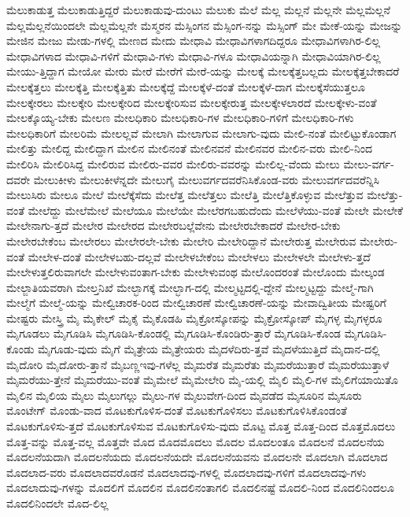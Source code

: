 {ಮೆಲುಕಾಡುತ್ತ
ಮೆಲುಕಾಡುತ್ತಿದ್ದರೆ
ಮೆಲುಕಾಡುವು-ದುಂಟು
ಮೆಲುಕು
ಮೆಲೆ
ಮೆಲ್ಲ
ಮೆಲ್ಲನೆ
ಮೆಲ್ಲನೇ
ಮೆಲ್ಲಮೆಲ್ಲನೆ
ಮೆಲ್ಲಮೆಲ್ಲನೆಯಿಂದಲೇ
ಮೆಲ್ಲಮೆಲ್ಲನೇ
ಮೆಸ್ಮರನ
ಮೆಸ್ಸಿಂಗನ
ಮೆಸ್ಸಿಂಗ-ನನ್ನು
ಮೆಸ್ಸಿಂಗ್
ಮೇ
ಮೇಕೆ-ಯನ್ನು
ಮೇಜನ್ನು
ಮೇಜಿನ
ಮೇಜು
ಮೇಡು-ಗಳಲ್ಲಿ
ಮೇಣದ
ಮೇದು
ಮೇಧಾವಿ
ಮೇಧಾವಿಗಳಾಗದಿದ್ದರೂ
ಮೇಧಾವಿಗಳಾಗಿರ-ಲಿಲ್ಲ
ಮೇಧಾವಿಗಳಾದ
ಮೇಧಾವಿ-ಗಳಿಗೆ
ಮೇಧಾವಿ-ಗಳು
ಮೇಧಾವಿ-ಗಳೂ
ಮೇಧಾವಿಯನ್ನಾಗಿ
ಮೇಧಾವಿಯಾಗಿರ-ಲಿಲ್ಲ
ಮೇಯು-ತ್ತಿದ್ದಾಗ
ಮೇಯೋ
ಮೇರು
ಮೇರೆ
ಮೇರೆಗೆ
ಮೇರೆ-ಯನ್ನು
ಮೇಲಕ್ಕೆ
ಮೇಲಕ್ಕೆತ್ತಬಲ್ಲದು
ಮೇಲಕ್ಕೆತ್ತಬೇಕಾದರೆ
ಮೇಲಕ್ಕೆತ್ತಲು
ಮೇಲಕ್ಕೆತ್ತಿ
ಮೇಲಕ್ಕೆತ್ತಿತು
ಮೇಲಕ್ಕೆದ್ದೆ
ಮೇಲಕ್ಕೆಳೆ-ದಂತೆ
ಮೇಲಕ್ಕೆಳೆ-ದಾಗ
ಮೇಲಕ್ಕೆಸೆಯುತ್ತಲೂ
ಮೇಲಕ್ಕೇರಲು
ಮೇಲಕ್ಕೇರಿ
ಮೇಲಕ್ಕೇರಿದ
ಮೇಲಕ್ಕೇರಿಸುವ
ಮೇಲಕ್ಕೇರುತ್ತ
ಮೇಲಕ್ಕೇಳಲಾರದೆ
ಮೇಲಕ್ಕೇಳು-ವಂತೆ
ಮೇಲಕ್ಕೊಯ್ಯ-ಬೇಕು
ಮೇಲಣ
ಮೇಲಧಿಕಾರಿ
ಮೇಲಧಿಕಾರಿ-ಗಳ
ಮೇಲಧಿಕಾರಿ-ಗಳಿಗೆ
ಮೇಲಧಿಕಾರಿ-ಗಳು
ಮೇಲಧಿಕಾರಿಗೆ
ಮೇಲರಿಮೆ
ಮೇಲಲ್ಲವೆ
ಮೇಲಾಗಿ
ಮೇಲಾಗುವ
ಮೇಲಾಗು-ವುದು
ಮೇಲಿ-ನಂತೆ
ಮೇಲಿಟ್ಟುಕೊಂಡಾಗ
ಮೇಲಿತ್ತು
ಮೇಲಿದ್ದ
ಮೇಲಿದ್ದಾಗ
ಮೇಲಿನ
ಮೇಲಿನಂತೆ
ಮೇಲಿನವನೆ
ಮೇಲಿನವರ
ಮೇಲಿನ-ವರು
ಮೇಲಿ-ನಿಂದ
ಮೇಲಿರಿಸಿ
ಮೇಲಿರಿಸಿದ್ದ
ಮೇಲಿರುವ
ಮೇಲಿರು-ವವರ
ಮೇಲಿರು-ವವರನ್ನು
ಮೇಲಿಲ್ಲ-ವೆಂದು
ಮೇಲು
ಮೇಲು-ವರ್ಗ-ದವರೇ
ಮೇಲುಕೀಳು
ಮೇಲುಕೀಳೆನ್ನದೇ
ಮೇಲುಗೈ
ಮೇಲುವರ್ಗದವರೆನಿಸಿಕೊಂಡ-ವರು
ಮೇಲುವರ್ಗದವರೆನ್ನಿಸಿ
ಮೇಲುಸಿರು
ಮೇಲೂ
ಮೇಲೆ
ಮೇಲೆಕ್ಕೆಸೆದು
ಮೇಲೆತ್ತ
ಮೇಲೆತ್ತಲು
ಮೇಲೆತ್ತಿ
ಮೇಲೆತ್ತಿಕೊಳ್ಳುವ
ಮೇಲೆತ್ತುವ
ಮೇಲೆತ್ತು-ವಂತೆ
ಮೇಲೆದ್ದು
ಮೇಲೆಮೇಲೆ
ಮೇಲೆಯೂ
ಮೇಲೆಯೇ
ಮೇಲೆರಗಬಹುದೆಂದು
ಮೇಲೆಳೆಯು-ವಂತೆ
ಮೇಲೇ
ಮೇಲೇಕೆ
ಮೇಲೇನಾಗು-ತ್ತದೆ
ಮೇಲೇರ
ಮೇಲೇರದ
ಮೇಲೇರಬಲ್ಲೆವೇನು
ಮೇಲೇರಬೇಕಾದರೆ
ಮೇಲೇರ-ಬೇಕು
ಮೇಲೇರಬೇಕೆಂಬ
ಮೇಲೇರಲು
ಮೇಲೇರಲೇ-ಬೇಕು
ಮೇಲೇರಿ
ಮೇಲೇರಿದ್ದಾನೆ
ಮೇಲೇರುತ್ತ
ಮೇಲೇರುವ
ಮೇಲೇರು-ವಂತೆ
ಮೇಲೇಳ-ದಂತೆ
ಮೇಲೇಳಬಹು-ದಲ್ಲವೆ
ಮೇಲೇಳಬೇಕೆಂಬ
ಮೇಲೇಳಲು
ಮೇಲೇಳಲೇ
ಮೇಲೇಳು-ತ್ತದೆ
ಮೇಲೇಳುತ್ತಲಿರುವಾಗಲೇ
ಮೇಲೇಳುವಂತಾಗ-ಬೇಕು
ಮೇಲೇಳುವಂಥ
ಮೇಲೊಂದರಂತೆ
ಮೇಲೊಂದು
ಮೇಲ್ಕಂಡ
ಮೇಲ್ಜಾತಿಯವರಾಗಿ
ಮೇಲ್ತನಿಖೆ
ಮೇಲ್ಭಾಗಕ್ಕೆ
ಮೇಲ್ಭಾಗ-ದಲ್ಲಿ
ಮೇಲ್ಮಟ್ಟದಲ್ಲಿ-ದ್ದೇನೆ
ಮೇಲ್ಮಟ್ಟದ್ದು
ಮೇಲ್ಮೆ-ಗಾಗಿ
ಮೇಲ್ಮೆಗೆ
ಮೇಲ್ಮೆ-ಯನ್ನು
ಮೇಲ್ವಿಚಾರಕ-ರಿಂದ
ಮೇಲ್ವಿಚಾರಣೆ
ಮೇಲ್ವಿಚಾರಣೆ-ಯನ್ನು
ಮೇವಾದ್ವಿತೀಯ
ಮೇಷ್ಟರಿಗೆ
ಮೇಷ್ಟರು
ಮೇಸ್ತ್ರಿ
ಮೈ
ಮೈಕೇಲ್
ಮೈಕೈ
ಮೈಕೊಡಹಿ
ಮೈಕ್ರೋಸ್ಕೋಪನ್ನು
ಮೈಕ್ರೋಸ್ಕೋಪ್
ಮೈಗಳ್ಳ
ಮೈಗಳ್ಳರೂ
ಮೈಗೂಡಲು
ಮೈಗೂಡಿಸಿ
ಮೈಗೂಡಿಸಿ-ಕೊಂಡಲ್ಲಿ
ಮೈಗೂಡಿಸಿ-ಕೊಂಡಿರು-ತ್ತಾರೆ
ಮೈಗೂಡಿಸಿ-ಕೊಂಡ
ಮೈಗೂಡಿಸಿ-ಕೊಂಡು
ಮೈಗೂಡು-ವುದು
ಮೈಗೆ
ಮೈತ್ರೇಯ
ಮೈತ್ರೇಯರು
ಮೈದಳೆದಿರು-ತ್ತವೆ
ಮೈದಳೆಯುತ್ತಿದೆ
ಮೈದಾನ-ದಲ್ಲಿ
ಮೈದೋರಿ
ಮೈದೋರು-ತ್ತಾನೆ
ಮೈಬಣ್ಣಇವು-ಗಳೆಲ್ಲ
ಮೈಮರೆತ
ಮೈಮರೆತು
ಮೈಮರೆಯುತ್ತಾರೆ
ಮೈಮರೆಯುತ್ತಾಳೆ
ಮೈಮರೆಯು-ತ್ತೇನೆ
ಮೈಮರೆಯು-ವಂತೆ
ಮೈಮೇಲೆ
ಮೈಮೇಲೇರಿ
ಮೈ-ಯಲ್ಲಿ
ಮೈಲಿ
ಮೈಲಿ-ಗಳ
ಮೈಲಿಗೆಯಾಯಿತೊ
ಮೈಲಿನ
ಮೈಲಿಯ
ಮೈಲು
ಮೈಲುಗಲ್ಲು
ಮೈಲು-ಗಳ
ಮೈಲುವೇಗ-ದಿಂದ
ಮೈವಡೆದ
ಮೈಸೂರಿನ
ಮೈಸೂರು
ಮೊಂಟೇಗ್
ಮೊಂಡು-ವಾದ
ಮೊಟಕುಗೊಳಿಸ-ದಂತೆ
ಮೊಟಕುಗೊಳಿಸಲು
ಮೊಟಕುಗೊಳಿಸಿಕೊಂಡಂತೆ
ಮೊಟಕುಗೊಳಿಸು-ತ್ತದೆ
ಮೊಟಕುಗೊಳಿಸುವ
ಮೊಟಕುಗೊಳಿಸು-ವುದು
ಮೊಟ್ಟ
ಮೊತ್ತ
ಮೊತ್ತ-ದಿಂದ
ಮೊತ್ತಮೊದಲು
ಮೊತ್ತ-ವನ್ನು
ಮೊತ್ತ-ವಲ್ಲ
ಮೊತ್ತವೇ
ಮೊದ
ಮೊದಮೊದಲು
ಮೊದಲ
ಮೊದಲಂತೂ
ಮೊದಲನೆ
ಮೊದಲನೆಯ
ಮೊದಲನೆಯದಾಗಿ
ಮೊದಲನೆಯದು
ಮೊದಲನೆಯದೇ
ಮೊದಲನೆಯವನು
ಮೊದಲನೇ
ಮೊದಲಾಗಿ
ಮೊದಲಾದ
ಮೊದಲಾದ-ವರು
ಮೊದಲಾದವರೊಡನೆ
ಮೊದಲಾದವು-ಗಳಲ್ಲಿ
ಮೊದಲಾದವು-ಗಳಿಗೆ
ಮೊದಲಾದವು-ಗಳು
ಮೊದಲಾದುವು-ಗಳನ್ನು
ಮೊದಲಿಗೆ
ಮೊದಲಿನ
ಮೊದಲಿನಂತಾಗಲಿ
ಮೊದಲಿನಷ್ಟೆ
ಮೊದಲಿ-ನಿಂದ
ಮೊದಲಿನಿಂದಲೂ
ಮೊದಲಿನಿಂದಲೇ
ಮೊದ-ಲಿಲ್ಲ
}
